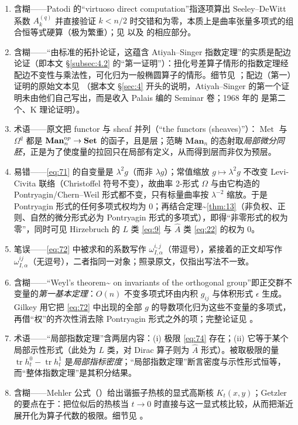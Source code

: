 \documentclass[11pt]{amsart}
\theoremstyle{definition}
\theoremstyle{remark}
\theoremstyle{plain}
\numberwithin{equation}{section}
\renewcommand{\:}{\colon}
\newcommand{\Ahat}{{\hat A}}
\DeclareMathOperator{\Met}{Met}
\DeclareMathOperator{\tr}{tr}
\newcommand{\Mn}{\mathbf{Man}_n}
\newcommand{\Set}{\mathbf{Set}}
\newcommand{\op}{^{\textnormal op}}
\newcommand{\q}{^{(q)}}
\begin{document}
\begin{enumerate}[leftmargin=2.2em,itemsep=2pt,topsep=2pt]
  \item 含糊——Patodi 的“virtuoso direct computation”指逐项算出 Seeley–DeWitt 系数 $A_k\q$ 并直接验证 $k<n/2$ 时交错和为零，本质上是曲率张量多项式的组合恒等式硬算（极为繁重）；见 \cite{P1} 以及 \cite{ABP} 的相应部分。
  \item 含糊——“由标准的拓扑论证，这蕴含 Atiyah–Singer 指数定理”的实质是配边论证（即本文 §\ref{subsec:4.2} 的“第一证明”）：扭化号差算子情形的指数定理经配边不变性与乘法性，可化归为一般椭圆算子的情形。细节见 \cite{ABP}；配边（第一）证明的原始文本见 \cite{Pa}（据本文 §\ref{sec:4} 开头的说明，Atiyah–Singer 的第一个证明未由他们自己写出，而是收入 Palais 编的 Seminar 卷；1968 年的 \cite{AS2} 是第二个、K 理论证明）。
  \item 术语——原文把 functor 与 sheaf 并列（“the functors (sheaves)”）：$\Met$ 与 $\Omega^q$ 都是 $\Mn\op\to\Set$ 的函子，且是层；范畴 $\Mn$ 的态射取\emph{局部微分同胚}，正是为了使度量的拉回只在局部有定义，从而得到层而非仅为预层。
  \item 易错——\eqref{eq:71} 的自变量是 $\lambda^2g$（而非 $\lambda g$）；常值缩放 $g\mapsto\lambda^2g$ 不改变 Levi-Civita 联络（Christoffel 符号不变），故曲率 2-形式 $\Omega$ 与由它构造的 Pontryagin/Chern–Weil 形式都不变，只有标量曲率按 $\lambda^{-2}$ 缩放。于是 Pontryagin 形式的任何多项式权均为 $0$；再结合定理\textasciitilde{}\ref{thm:13}（非负权、正则、自然的微分形式必为 Pontryagin 形式的多项式），即得“非零形式的权为零”，同时可见 Hirzebruch 的 $L$ 类 \eqref{eq:9} 与 $\Ahat$ 类 \eqref{eq:22} 的权为 $0$。
  \item 笔误——\eqref{eq:72} 中被求和的系数写作 $\omega ^{i,j}_{I,\alpha }$（带逗号），紧接着的正文却写作 $\omega ^{ij}_{I,\alpha }$（无逗号），二者指同一对象；照录原文，仅指出写法不一致。
  \item 含糊——“Weyl's theorem\textasciitilde{}\cite{W} on invariants of the orthogonal group”即正交群不变量的\emph{第一基本定理}：$O(n)$ 不变多项式环由内积 $g_{ij}$ 与体积形式 $\epsilon$ 生成。Gilkey 用它把 \eqref{eq:72} 中出现的全部 $g$ 的导数项化归为这些不变量的多项式，再借“权”的齐次性消去除 Pontryagin 形式之外的项；完整论证见 \cite{ABP}。
  \item 术语——“局部指数定理”含两层内容：(i) 极限 \eqref{eq:74} 存在；(ii) 它等于某个局部示性形式（此处为 $L$ 类，对 Dirac 算子则为 $\Ahat$ 形式）。被取极限的量 $\tr h^0_t-\tr h^1_t$ 是\emph{局部指标密度}；“局部指数定理”断言密度与示性形式恒等，而“整体指数定理”是其积分结果。
  \item 含糊——Mehler 公式（\cite[p.\textasciitilde{}19]{GJ}）给出谐振子热核的显式高斯核 $K_t(x,y)$；Getzler 的要点在于：把位似后的热核当 $t\to0$ 时直接与这一显式核比较，从而把渐近展开化为算子代数的极限。细节见 \cite{Ge2}。

\end{enumerate}
\end{document}
